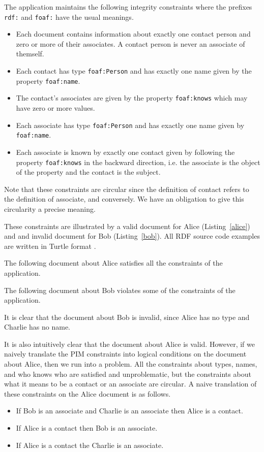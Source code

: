 \documentclass{article}
\begin{document}
The application maintains the following integrity constraints where the
prefixes {\tt rdf:}\cite{w3c:rdf11} and {\tt foaf:}\cite{foaf:spec} have the usual meanings.
\cbend
\begin{itemize}
\item Each document contains information about exactly one contact person and zero or more of their associates.
\cbstart
A contact person is never an associate of themself.
\cbend
\item Each contact has type {\tt foaf:Person} and has exactly one name given by the property {\tt foaf:name}.
\item The contact's associates are given by the property {\tt foaf:knows} which may have zero or more values.
\item Each associate has type {\tt foaf:Person} and has exactly one name given by {\tt foaf:name}.
\item Each associate is known by exactly one contact given by following the property {\tt foaf:knows} in the backward direction, i.e. the associate is the object of the property and the contact is the subject.
\end{itemize}

Note that these constraints are circular since the definition of contact refers to the definition of associate, and conversely.
We have an obligation to give this circularity a precise meaning.

These constraints are illustrated by a valid document for Alice (Listing~\ref{alice}) and and invalid document for Bob (Listing~\ref{bob}).
All RDF source code examples are written in Turtle format \cite{w3c:turtle11}.

The following document about Alice satisfies all the constraints of the application.


The following document about Bob violates some of the constraints of the application.


\cbstart
It is clear that the document about Bob is invalid, since Alice has no type and Charlie has no name.

It is also intuitively clear that the document about Alice is valid.
However, if we naively translate the PIM constraints into logical conditions on the document about Alice, then we run into a problem.
All the constraints about types, names, and who knows who are satisfied and unproblematic, but the
constraints about what it means to be a contact or an associate are circular.
A naive translation of these constraints on the Alice document is as follows.
\begin{itemize}
\item If Bob is an associate and Charlie is an associate then Alice is a contact.
\item If Alice is a contact then Bob is an associate.
\item If Alice is a contact the Charlie is an associate.
\end{itemize}
\end{document}
